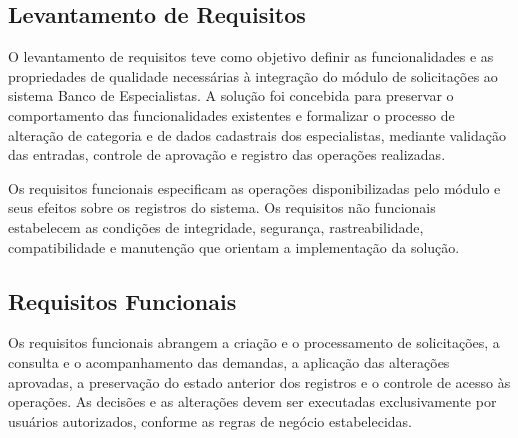 \subsection{Levantamento de Requisitos}

O levantamento de requisitos teve como objetivo definir as funcionalidades 
e as propriedades de qualidade necessárias à integração do módulo de 
solicitações ao sistema Banco de Especialistas. A solução foi concebida 
para preservar o comportamento das funcionalidades existentes e formalizar 
o processo de alteração de categoria e de dados cadastrais dos especialistas, 
mediante validação das entradas, controle de aprovação e registro das 
operações realizadas.

Os requisitos funcionais especificam as operações disponibilizadas pelo 
módulo e seus efeitos sobre os registros do sistema. Os requisitos não 
funcionais estabelecem as condições de integridade, segurança, 
rastreabilidade, compatibilidade e manutenção que orientam a implementação 
da solução.

\subsection{Requisitos Funcionais}
\label{subsec:requisitos-funcionais}
Os requisitos funcionais abrangem a criação e o processamento de 
solicitações, a consulta e o acompanhamento das demandas, a aplicação 
das alterações aprovadas, a preservação do estado anterior dos registros 
e o controle de acesso às operações. As decisões e as alterações devem 
ser executadas exclusivamente por usuários autorizados, conforme as 
regras de negócio estabelecidas.

